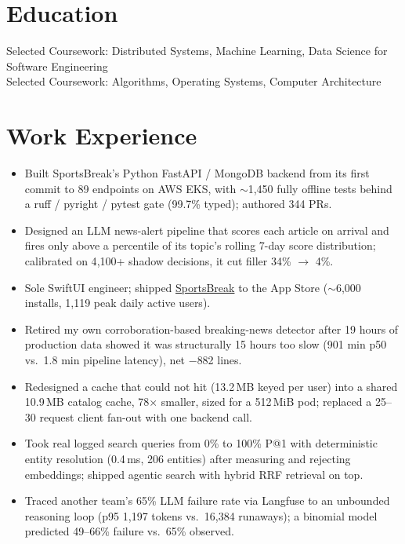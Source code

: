 \documentclass[11pt, letterpaper]{article}
\begin{document}

\section{Education}
Selected Coursework: Distributed Systems, Machine Learning, Data Science for Software Engineering\\[1pt]
Selected Coursework: Algorithms, Operating Systems, Computer Architecture

\section{Work Experience}
\begin{itemize}
  \item Built SportsBreak's Python FastAPI / MongoDB backend from its first commit to 89 endpoints on AWS EKS, with $\sim$1{,}450 fully offline tests behind a ruff / pyright / pytest gate (99.7\% typed); authored 344 PRs.
  \item Designed an LLM news-alert pipeline that scores each article on arrival and fires only above a percentile of its topic's rolling 7-day score distribution; calibrated on 4{,}100+ shadow decisions, it cut filler 34\% $\to$ 4\%.
  \item Sole SwiftUI engineer; shipped \href{https://apps.apple.com/app/id6762649287}{SportsBreak} to the App Store ($\sim$6{,}000 installs, 1{,}119 peak daily active users).
  \item Retired my own corroboration-based breaking-news detector after 19 hours of production data showed it was structurally 15 hours too slow (901 min p50 vs.\ 1.8 min pipeline latency), net $-$882 lines.
  \item Redesigned a cache that could not hit (13.2\,MB keyed per user) into a shared 10.9\,MB catalog cache, 78$\times$ smaller, sized for a 512\,MiB pod; replaced a 25--30 request client fan-out with one backend call.
  \item Took real logged search queries from 0\% to 100\% P@1 with deterministic entity resolution (0.4\,ms, 206 entities) after measuring and rejecting embeddings; shipped agentic search with hybrid RRF retrieval on top.
  \item Traced another team's 65\% LLM failure rate via Langfuse to an unbounded reasoning loop (p95 1{,}197 tokens vs.\ 16{,}384 runaways); a binomial model predicted 49--66\% failure vs.\ 65\% observed.
\end{itemize}
\end{document}
